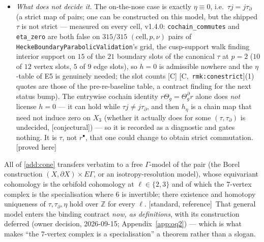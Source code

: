 \documentclass[11pt]{article}
\theoremstyle{remark}
\newcommand{\Z}{\mathbb{Z}}
\newcommand{\Ga}{\Gamma}
\newcommand{\HA}[1]{[C,~\texttt{#1}]}      %
\newcommand{\PROVED}{\textsf{[proved here]}}
\newcommand{\STD}{\textsf{[standard, reference]}}
\newcommand{\CONJ}{\textsf{[conjectural]}}
\begin{document}
\begin{enumerate}[label=(A\arabic*)]
\begin{itemize}
  \item \emph{What does not decide it.} The on-the-nose case is exactly $\eta\equiv0$, i.e.\
    $\tau j=j\tau_\partial$ (a strict map of pairs; one can be constructed on this model, but the
    shipped $\tau$ is not strict --- measured on every cell, v1.4.0: \texttt{cochain\_commutes}
    and \texttt{eta\_zero} are both false on $315/315$ $(\text{cell},p,\nu)$ pairs of
    \texttt{HeckeBoundaryParabolicValidation}'s grid, the cusp-support walk finding interior
    support on $15$ of the $21$ boundary slots of the canonical $\tau$ at $p=2$ ($10$ of $12$
    vertex slots, $5$ of $9$ edge slots), so $h=0$ is admissible nowhere and the $\eta$-table of
    E5 is genuinely needed; the slot counts [C] \HA{rmk:conestrict}(1) quotes are those of the
    pre-re-baseline table, a contract finding for the next status bump). The entrywise cochain identity $r\Theta_g=\Theta_g^\partial r$
    alone does \emph{not} license $h=0$ --- it can hold while $\tau j\ne j\tau_\partial$, and then
    $h_\eta$ is a chain map that need not induce zero on $X_3$ (whether it actually does for some
    $(\tau,\tau_\partial)$ is undecided, \CONJ) --- so it is recorded as a diagnostic and gates
    nothing. It
    is $\tau$, not $r^\bullet$, that one could change to obtain strict commutation. \PROVED
  \end{itemize}
  All of \ref{add:cone} transfers verbatim to a free $\Ga$-model of the pair (the Borel construction
  $(X,\partial X)\times E\Ga$, or an isotropy-resolution model), whose equivariant cohomology is the
  orbifold cohomology at $\ell\in\{2,3\}$ and of which the 7-vertex complex is the specialisation
  where $6$ is invertible; there existence and homotopy uniqueness of $\tau,\tau_\partial,\eta$ hold
  over $\Z$ for every $\ell$. \STD\
  That general model enters the binding contract \emph{now, as definitions}, with its construction
  deferred (owner decision, 2026-09-15; Appendix~\ref{app:oq2}) --- which is what makes
  ``the 7-vertex complex is a specialisation'' a theorem rather than a slogan.


\end{enumerate}
\end{document}
